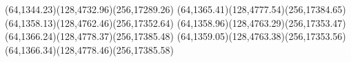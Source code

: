 {(64,1344.23)(128,4732.96)(256,17289.26)}
{(64,1365.41)(128,4777.54)(256,17384.65)}
{(64,1358.13)(128,4762.46)(256,17352.64)}
{(64,1358.96)(128,4763.29)(256,17353.47)}
{(64,1366.24)(128,4778.37)(256,17385.48)}
{(64,1359.05)(128,4763.38)(256,17353.56)}
{(64,1366.34)(128,4778.46)(256,17385.58)}